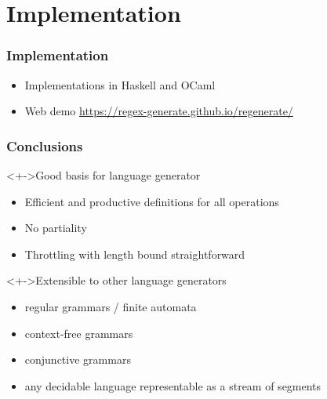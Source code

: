 \documentclass[pdftex,aspectratio=169]{beamer}
\begin{document}
\section{Implementation}
\begin{frame}
  \frametitle{Implementation}
  \begin{itemize}
  \item Implementations in Haskell and OCaml
  \item Web demo \url{https://regex-generate.github.io/regenerate/}
  \end{itemize}
\end{frame}
\begin{frame}
  \frametitle{Conclusions}
  \vspace{-\baselineskip}
  \begin{block}<+->{Good basis for language generator}
    \begin{itemize}
    \item Efficient and productive definitions for all operations
    \item No partiality
    \item Throttling with length bound straightforward
    \end{itemize}
  \end{block}
  \begin{block}<+->{Extensible to other language generators}
    \begin{itemize}
    \item regular grammars / finite automata
    \item context-free grammars
    \item conjunctive grammars
    \item any decidable language representable as a stream of segments 
    \end{itemize}
  \end{block}
\end{frame}
\end{document}
